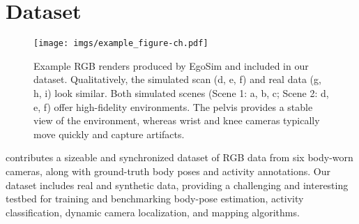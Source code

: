 \section{\dataset{} Dataset}\label{sec:Dataset}

    

\begin{figure}[t]
    \centering
    \texttt{[image: imgs/example\_figure-ch.pdf]}
    \caption{Example RGB renders produced by EgoSim and included in our \dataset dataset. Qualitatively, the simulated scan (d, e, f) and real data (g, h, i) look similar.
    Both simulated scenes (Scene 1: a, b, c; Scene 2: d, e, f) offer high-fidelity environments.
    The pelvis provides a stable view of the environment, whereas wrist and knee cameras typically move quickly and capture artifacts.}
    \label{fig:overall}
\end{figure}

\dataset{} contributes a sizeable and synchronized dataset of RGB data from six body-worn cameras, along with ground-truth body poses and activity annotations.
Our dataset includes real and synthetic data, providing a challenging and interesting testbed for training and benchmarking body-pose estimation, activity classification, dynamic camera localization, and mapping algorithms.


